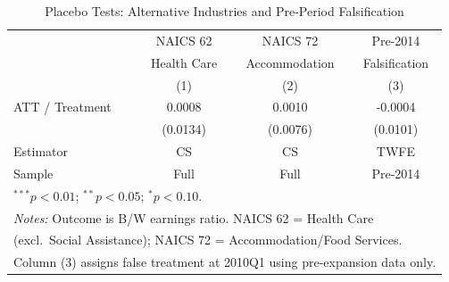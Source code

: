 \begin{table}[t]
\centering
\caption{Placebo Tests: Alternative Industries and Pre-Period Falsification}
\label{tab:placebo}
\begin{tabular}{lccc}
\hline\hline
 & NAICS 62 & NAICS 72 & Pre-2014 \\
 & Health Care & Accommodation & Falsification \\
 & (1) & (2) & (3) \\
\hline
ATT / Treatment & 0.0008 & 0.0010 & -0.0004 \\
 & (0.0134) & (0.0076) & (0.0101) \\
\hline
Estimator & CS & CS & TWFE \\
Sample & Full & Full & Pre-2014 \\
\hline
\multicolumn{4}{l}{\footnotesize $^{***}p<0.01$; $^{**}p<0.05$; $^{*}p<0.10$.}\\
\multicolumn{4}{l}{\footnotesize \textit{Notes:} Outcome is B/W earnings ratio. NAICS 62 = Health Care}\\
\multicolumn{4}{l}{\footnotesize (excl.\ Social Assistance); NAICS 72 = Accommodation/Food Services.}\\
\multicolumn{4}{l}{\footnotesize Column (3) assigns false treatment at 2010Q1 using pre-expansion data only.}\\
\hline\hline
\end{tabular}
\end{table}

